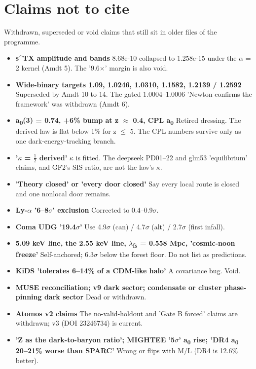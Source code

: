 \documentclass[10pt]{article}
\begin{document}
\section{Claims not to cite}
Withdrawn, superseded or void claims that still sit in older files of the programme.

\begin{itemize}
\item \textbf{s\^{}TX amplitude and bands} 8.68e-10 collapsed to 1.258e-15 under the \ensuremath{\alpha} = 2 kernel (Amdt 5). The '9.6\ensuremath{\times}' margin is also void.
\item \textbf{Wide-binary targets 1.09, 1.0246, 1.0310, 1.1582, 1.2139 / 1.2592} Superseded by Amdt 10 to 14. The gated 1.0004--1.0006 'Newton confirms the framework' was withdrawn (Amdt 6).
\item \textbf{a\textsubscript{0}(3) = 0.74, +6\% bump at z \ensuremath{\approx} 0.4, CPL a\textsubscript{0}} Retired dressing. The derived law is flat below 1\% for z \ensuremath{\leq} 5. The CPL numbers survive only as one dark-energy-tracking branch.
\item \textbf{'\ensuremath{\kappa} = \ensuremath{\tfrac{1}{2}} derived'} \ensuremath{\kappa} is fitted. The deepseek PD01--22 and glm53 'equilibrium' claims, and GF2's SIS ratio, are not the law's \ensuremath{\kappa}.
\item \textbf{'Theory closed' or 'every door closed'} Say every local route is closed and one nonlocal door remains.
\item \textbf{Ly-\ensuremath{\alpha} '6--8\ensuremath{\sigma}' exclusion} Corrected to 0.4--0.9\ensuremath{\sigma}.
\item \textbf{Coma UDG '19.4\ensuremath{\sigma}'} Use 4.9\ensuremath{\sigma} (can) / 4.7\ensuremath{\sigma} (alt) / 2.7\ensuremath{\sigma} (first infall).
\item \textbf{5.09 keV line, the 2.55 keV line, \ensuremath{\lambda}\textsubscript{fs} = 0.558 Mpc, 'cosmic-noon freeze'} Self-anchored; 6.3\ensuremath{\sigma} below the forest floor. Do not list as predictions.
\item \textbf{KiDS 'tolerates 6--14\% of a CDM-like halo'} A covariance bug. Void.
\item \textbf{MUSE reconciliation; v9 dark sector; condensate or cluster phase-pinning dark sector} Dead or withdrawn.
\item \textbf{Atomos v2 claims} The no-valid-holdout and 'Gate B forced' claims are withdrawn; v3 (DOI 23246734) is current.
\item \textbf{'Z as the dark-to-baryon ratio'; MIGHTEE '5\ensuremath{\sigma}' a\textsubscript{0} rise; 'DR4 a\textsubscript{0} 20--21\% worse than SPARC'} Wrong or flips with M/L (DR4 is 12.6\% better).

\end{itemize}
\end{document}
